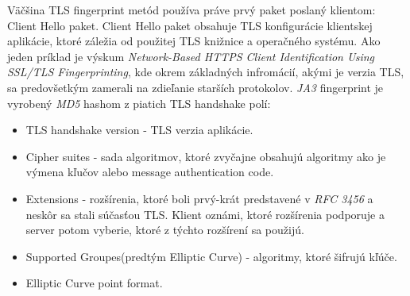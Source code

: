 Väčšina TLS fingerprint metód používa práve prvý paket poslaný klientom: Client Hello paket. Client Hello paket obsahuje TLS konfigurácie klientskej aplikácie, ktoré záležia od použitej TLS knižnice a operačného systému. Ako jeden príklad je výskum \emph{Network-Based HTTPS Client Identification Using SSL/TLS Fingerprinting}, kde okrem základných infromácií, akými je verzia TLS,  sa predovšetkým zamerali na zdieľanie starších protokolov.\cite{example} \emph{JA3} fingerprint je vyrobený  \emph{MD5} hashom z piatich TLS handshake polí:
\begin{itemize}
    \item TLS handshake version - TLS verzia aplikácie.
    \item Cipher suites - sada algoritmov, ktoré zvyčajne obsahujú algoritmy ako je výmena kľučov alebo message authentication code.
    \item Extensions - rozšírenia, ktoré boli prvý-krát predstavené v \emph{RFC 3456} a neskôr sa stali súčasťou TLS. Klient oznámi, ktoré rozšírenia podporuje a server potom vyberie, ktoré z týchto rozšírení sa použijú.\cite{extension}
    \item Supported Groupes(predtým Elliptic Curve) - algoritmy, ktoré šifrujú kľúče.\cite{ec}
    \item Elliptic Curve point format.

\end{itemize}
\cite{ja3}

